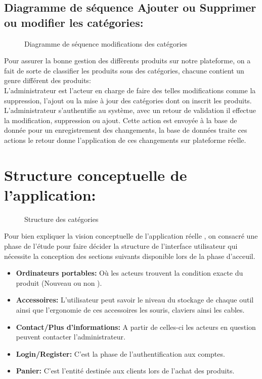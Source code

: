 \documentclass[a4paper]{report}
\begin{document}
\begin{doublespace}
    \subsection{Diagramme de séquence Ajouter ou Supprimer ou
        modifier les catégories:}
    \begin{figure}[H]
        \begin{center}
            \caption{Diagramme de séquence modifications des
                catégories}
        \end{center}
    \end{figure}
    Pour assurer la bonne gestion des diffèrents produits sur
    notre plateforme, on a fait de sorte de classifier les produits sous des
    catégories, chacune contient un genre différent des produits:\\
    L'administrateur est l'acteur en charge de faire des telles modifications comme
    la suppression, l'ajout ou la mise à jour des catégories dont on inscrit les
    produits. L'administrateur s'authentifie au système, avec un retour de
    validation il effectue la modification, suppression ou ajout. Cette action est
    envoyée à la base de donnée pour un enregistrement des changements, la base de
    données traite ces actions le retour donne l'application de ces changements sur
    plateforme réelle.
    \section{Structure conceptuelle de l'application:}
    \begin{figure}[H]
        \begin{center}
            \caption{Structure des catégories}
        \end{center}
    \end{figure}
    Pour bien expliquer la vision conceptuelle de l'application
    réelle , on consacré une phase de l'étude pour faire décider la structure de
    l'interface utilisateur  qui nécessite la conception des  sections suivants
    disponible lors de la phase d'acceuil.
    \begin{itemize}
        \item \textbf{Ordinateurs portables:} Où les acteurs
              trouvent la condition exacte du produit (Nouveau ou non ).
        \item \textbf{Accessoires:} L'utilisateur peut savoir
              le niveau du stockage de chaque outil ainsi que l'ergonomie de ces accessoires
              les souris, claviers ainsi les cables.
        \item \textbf{Contact/Plus d'informations:} A partir de
              celles-ci les acteurs en question peuvent contacter l'administrateur.
        \item \textbf{Login/Register:} C'est la phase de
              l'authentification aux comptes.
        \item \textbf{Panier:} C'est l'entité destinée aux
              clients lors de l'achat des produits.


\end{itemize}
\end{doublespace}
\end{document}
